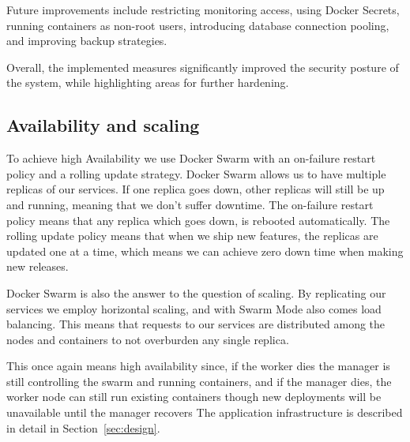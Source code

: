 Future improvements include restricting monitoring access, using Docker Secrets, running containers as non-root users, introducing database connection pooling, and improving backup strategies.

Overall, the implemented measures significantly improved the security posture of the system, while highlighting areas for further hardening.


\subsection{Availability and scaling}

To achieve high Availability we use Docker Swarm with an on-failure restart policy and a rolling update strategy. Docker Swarm allows us to have multiple replicas of our services. If one replica goes down, other replicas will still be up and running, meaning that we don't suffer downtime. The on-failure restart policy means that any replica which goes down, is rebooted automatically. The rolling update policy means that when we ship new features, the replicas are updated one at a time, which means we can achieve zero down time when making new releases. \newline

Docker Swarm is also the answer to the question of scaling. By replicating our services we employ horizontal scaling, and with Swarm Mode also comes load balancing. This means that requests to our services are distributed among the nodes and containers to not overburden any single replica. 

This once again means high availability since, if the worker dies the manager is still controlling the swarm and running containers, and if the manager dies, the worker node can still run existing containers 
though new deployments will be unavailable until the manager recovers 
The application infrastructure is described in detail in Section~\ref{sec:design}.